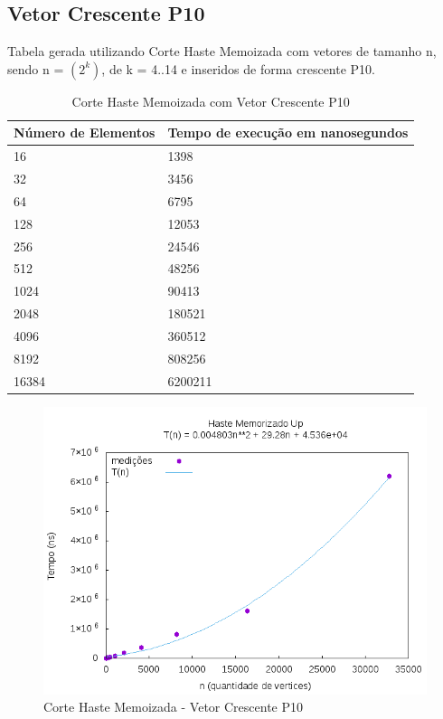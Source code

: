 \documentclass[12pt,a4paper,twoside]{report}
\begin{document}
\subsection{Vetor Crescente P10}
Tabela gerada utilizando Corte Haste Memoizada com vetores de tamanho n, sendo n = $(2^k)$, de k = 4..14 e inseridos de forma crescente P10.
\begin{table}[H]
\centering
\caption{Corte Haste Memoizada com Vetor Crescente P10}
\label{my-label}
\begin{tabular}{|l|l|}
\hline
\multicolumn{1}{|c|}{\textbf{Número de Elementos}} & \multicolumn{1}{c|}{\textbf{Tempo de execução em nanosegundos}} \\ \hline
16 & 1398 \\ \hline
32 & 3456 \\ \hline
64 & 6795 \\ \hline
128 & 12053 \\ \hline
256 & 24546 \\ \hline
512 & 48256 \\ \hline
1024 & 90413 \\ \hline
2048 & 180521 \\ \hline
4096 & 360512 \\ \hline
8192 & 808256 \\ \hline
16384 & 6200211 \\ \hline
\end{tabular}
\end{table}

\begin{figure}[H]
    \centering
    \includegraphics[width=0.7\linewidth]{graficos/CorteHasteMemorizado/Crescente P10/HasteMemo.png}
  \caption{Corte Haste Memoizada - Vetor Crescente P10}
\end{figure}
\end{document}
